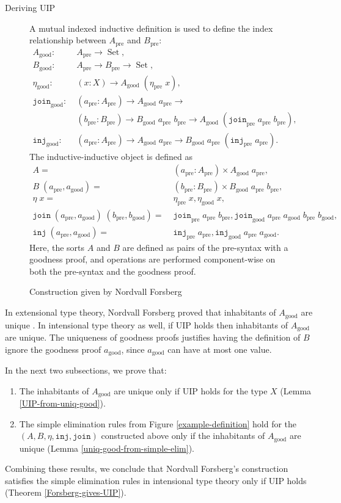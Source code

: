 \documentclass[runningheads]{llncs}
\DeclareMathOperator{\USet}{Set}
\newcommand{\pre}[1]{{#1}_\text{pre}}
\newcommand{\good}[1]{{#1}_\text{good}}
\newcommand{\join}{\texttt{join}}
\newcommand{\inj}{\texttt{inj}}
\def\Forsberg/{Nordvall Forsberg}
\begin{document}
\begin{section}{Deriving UIP}
\begin{figure}[htpb]
\begin{flushleft}
A mutual indexed inductive definition is used to define the index relationship between $\pre{A}$ and $\pre{B}$:
\begin{align*}
\good{A}:&\; \pre{A}\to\USet,\\
\good{B}:&\; \pre{A}\to\pre{B}\to\USet,\\
\good{\eta}:&\; (x : X) \to \good{A}\;(\pre{\eta}\;x),\\
\good{\join}:&\; (\pre{a} : \pre{A})\to\good{A}\;\pre{a}\to\\&\;(\pre{b} : \pre{B})\to\good{B}\;\pre{a}\;\pre{b}\to\good{A}\;(\pre{\join}\;\pre{a}\;\pre{b}),\\
\good{\inj}:&\;(\pre{a}:\pre{A})\to\good{A}\;\pre{a}\to\good{B}\;\pre{a}\;(\pre{\inj}\;\pre{a}).
\end{align*}
The inductive-inductive object is defined as
\begin{align*}
A =&\; (\pre{a} : \pre{A})\times \good{A}\;\pre{a},\\
B\; (\pre{a},\good{a}) =&\; (\pre{b} : \pre{B})\times\good{B}\;\pre{a}\;\pre{b},\\
\eta\;x =&\;\pre{\eta}\;x,\good{\eta}\;x,\\
\join\;(\pre{a},\good{a})\;(\pre{b},\good{b})=&\; \pre{\join}\;\pre{a}\;\pre{b}, \good{\join}\;\pre{a}\;\good{a}\;\pre{b}\;\good{b},\\
\inj\;(\pre{a},\good{a})=&\;\pre{\inj}\;\pre{a}, \good{\inj}\;\pre{a}\;\good{a}.
\end{align*}
Here, the sorts $A$ and $B$ are defined as pairs of the pre-syntax with a goodness proof, and operations are performed component-wise on both the pre-syntax and the goodness proof.
\end{flushleft}
\caption{\label{example-good-mutind}Construction given by \Forsberg/}
\end{figure}

In extensional type theory, \Forsberg/ proved that inhabitants of $\good{A}$ are unique \citep[][Lemma 5.37(ii)]{nordvallforsberg2013thesis}. In intensional type theory as well, if UIP holds then inhabitants of $\good{A}$ are unique. The uniqueness of goodness proofs justifies having the definition of $B$ ignore the goodness proof $\good{a}$, since $\good{a}$ can have at most one value.

In the next two subsections, we prove that:
\begin{enumerate}
    \item The inhabitants of $\good{A}$ are unique only if UIP holds for the type $X$ (Lemma \ref{UIP-from-uniq-good}).
    \item The simple elimination rules from Figure \ref{example-definition} hold for the $(A, B, \eta, \inj, \join)$ constructed above only if the inhabitants of $\good{A}$ are unique (Lemma \ref{uniq-good-from-simple-elim}).
\end{enumerate}
Combining these results, we conclude that \Forsberg/'s construction satisfies the simple elimination rules in intensional type theory only if UIP holds (Theorem \ref{Forsberg-gives-UIP}).


\end{section}
\end{document}
